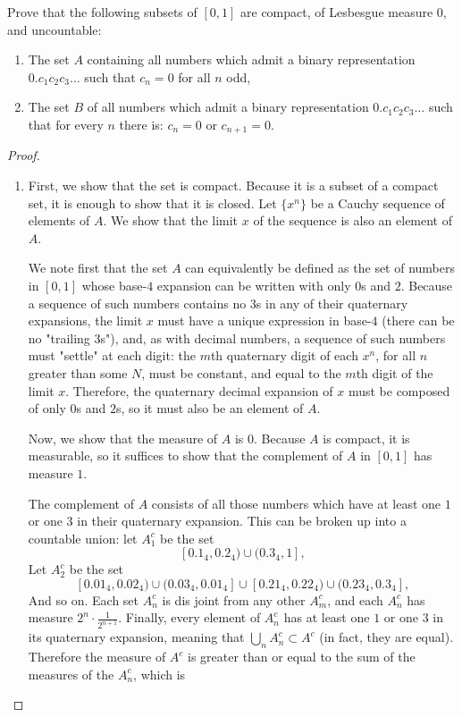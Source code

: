 \documentclass[12pt]{article}
\theoremstyle{definition}
\newenvironment{problem}[2][Problem]{\begin{trivlist}
\item[\hskip \labelsep {\bfseries #1}\hskip \labelsep {\bfseries #2.}]}{\end{trivlist}}
\begin{document}
\begin{problem}{4}
	Prove that the following subsets of $[0,1]$ are compact, of Lesbesgue measure $0$, and uncountable:
	\begin{enumerate}[label=(\roman*)]
		\item The set $A$ containing all numbers which admit a binary representation $0.c_1c_2c_3\dots$ such that $c_n=0$ for all $n$ odd,
		\item The set $B$ of all numbers which admit a binary representation $0.c_1c_2c_3\dots$ such that for every $n$ there is: $c_n = 0$ or $c_{n+1} = 0$.
	\end{enumerate}
	\begin{proof}
		\begin{enumerate}[label=(\roman*)]
			\item First, we show that the set is compact. Because it is a subset of a compact set, it is enough to show that it is closed. Let $\{x^n\}$ be a Cauchy sequence of elements of $A$. We show that the limit $x$ of the sequence is also an element of $A$.
			\par We note first that the set $A$ can equivalently be defined as the set of numbers in $[0,1]$ whose base-$4$ expansion can be written with only $0$s and $2$. Because a sequence of such numbers contains no $3$s in any of their quaternary expansions, the limit $x$ must have a unique expression in base-$4$ (there can be no "trailing $3$s"), and, as with decimal numbers, a sequence of such numbers must "settle" at each digit: the $m$th quaternary digit of each $x^n$, for all $n$ greater than some $N$, must be constant, and equal to the $m$th digit of the limit $x$. Therefore, the quaternary decimal expansion of $x$ must be composed of only $0$s and $2$s, so it must also be an element of $A$.
			\par Now, we show that the measure of $A$ is $0$. Because $A$ is compact, it is measurable, so it suffices to show that the complement of $A$ in $[0,1]$ has measure $1$. 
			\par The complement of $A$ consists of all those numbers which have at least one $1$ or one $3$ in their quaternary expansion. This can be broken up into a countable union: let $A^c_1$ be the set
			\[ [0.1_4, 0.2_4) \cup (0.3_4, 1],\]
			Let $A^c_2$ be the set
			\[ [0.01_4, 0.02_4) \cup (0.03_4, 0.01_4] \cup [0.21_4, 0.22_4) \cup (0.23_4, 0.3_4],\]
			And so on. Each set $A^c_n$ is dis joint from any other $A^c_m$, and each $A^c_n$ has measure $2^n \cdot \frac{1}{2^{n+1}}$. Finally, every element of $A^c_n$ has at least one $1$ or one $3$ in its quaternary expansion, meaning that $\bigcup_n A^c_n \subset A^c$ (in fact, they are equal). Therefore the measure of $A^c$ is greater than or equal to the sum of the measures of the $A^c_n$, which is 

\end{enumerate}
\end{proof}
\end{problem}
\end{document}
